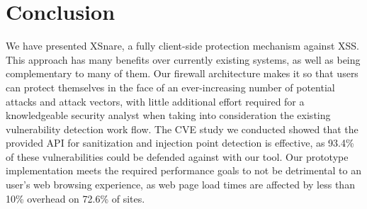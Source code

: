 \section{Conclusion}
We have presented XSnare, a fully client-side protection mechanism against XSS. This approach has many benefits over currently existing systems, as well as being complementary to many of them. Our firewall architecture makes it so that users can protect themselves in the face of an ever-increasing number of potential attacks and attack vectors, with little additional effort required for a knowledgeable security analyst when taking into consideration the existing vulnerability detection work flow. The CVE study we conducted showed that the provided API for sanitization and injection point detection is effective, as 93.4\% of these vulnerabilities could be defended against with our tool. Our prototype implementation meets the required performance goals to not be detrimental to an user's web browsing experience, as web page load times are affected by less than 10\% overhead on 72.6\% of sites.
